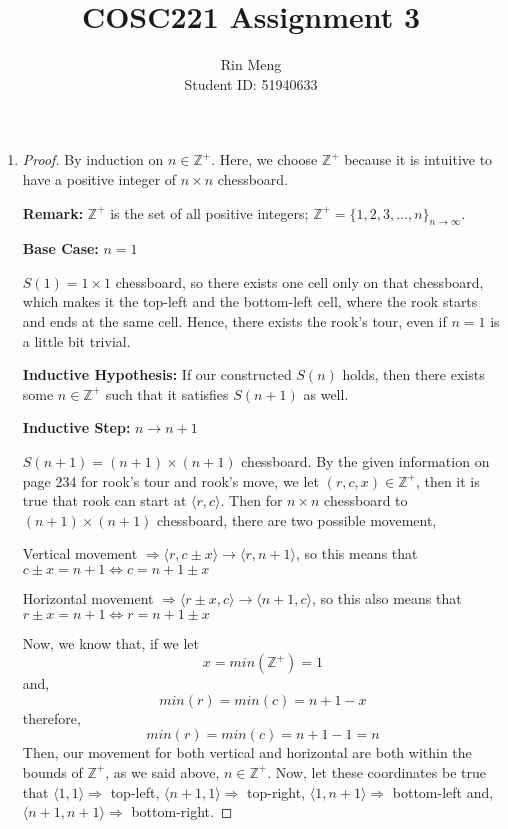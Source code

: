 \documentclass[12pt]{article}
\begin{document}
\title{COSC221 Assignment 3}
\author{Rin Meng \\ Student ID: 51940633}
\maketitle


\begin{enumerate}[label=Part \Alph*)]
    \item
    \begin{proof}[Proof]
        By induction on $n \in \mathbb{Z}^{+}$. Here, we choose $\mathbb{Z}^{+}$ because it is intuitive to have a positive integer of $n \times n$ chessboard. 
        
        \textbf{Remark:} $\mathbb{Z}^{+}$ is the set of all positive integers; $\mathbb{Z}^{+} = \{1, 2, 3, \ldots, n\}_{n \rightarrow \infty}$.
        
        \textbf{Base Case:} $n = 1$
        
        $S(1) = 1 \times 1$ chessboard, so there exists one cell only on that chessboard, which makes it the top-left and the bottom-left cell, where the rook starts and ends at the same cell. Hence, there exists the rook's tour, even if $n = 1$ is a little bit trivial.
        
        \textbf{Inductive Hypothesis:} If our constructed $S(n)$ holds, then there exists some $n \in \mathbb{Z}^{+}$ such that it satisfies $S(n + 1)$ as well.
        
        \textbf{Inductive Step:} $n \rightarrow n + 1$
        
        $S(n+1) = (n + 1) \times (n + 1)$ chessboard. By the given information on page 234 for rook's tour and rook's move, we let $(r, c, x) \in \mathbb{Z}^{+}$, then it is true that rook can start at $\langle r, c \rangle$. Then for $n \times n$ chessboard to $(n + 1) \times (n + 1)$ chessboard, there are two possible movement,
        
        Vertical movement $\Rightarrow \langle r, c \pm x \rangle \rightarrow \langle r, n+1 \rangle$, so this means that $c \pm x = n + 1 \Leftrightarrow c = n + 1 \pm x$
        
        Horizontal movement $\Rightarrow \langle r \pm x, c \rangle \rightarrow \langle n+1, c \rangle$, so this also means that $r \pm x = n + 1 \Leftrightarrow r = n + 1 \pm x$
        
        Now, we know that, if we let
        $$x = min(\mathbb{Z}^{+}) = 1$$
        and, 
        $$min(r) = min(c) = n + 1 - x$$
        therefore,
		$$min(r) = min(c) = n + 1 - 1 = n$$
        Then, our movement for both vertical and horizontal are both within the bounds of $\mathbb{Z}^{+}$, as we said above, $n \in \mathbb{Z}^{+}$. Now, let these coordinates be true that $\langle 1, 1 \rangle \Rightarrow $ top-left, $\langle n + 1, 1 \rangle \Rightarrow $ top-right, $\langle 1, n + 1 \rangle \Rightarrow $ bottom-left and, $\langle n + 1, n + 1 \rangle \Rightarrow $ bottom-right. 
        

\end{proof}
\end{enumerate}
\end{document}

